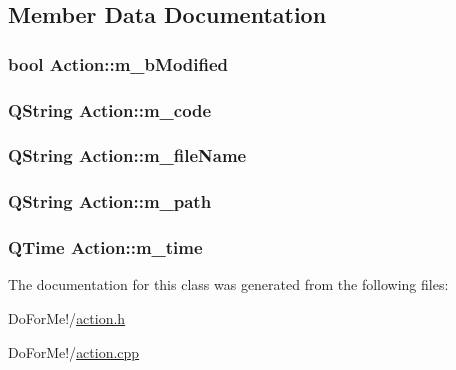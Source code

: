 \subsection{Member Data Documentation}
\hypertarget{class_action_ad7930bec6d8cff987c1882d76642369d}{
\subsubsection[{m\-\_\-b\-Modified}]{\setlength{\rightskip}{0pt plus 5cm}bool Action\-::m\-\_\-b\-Modified\hspace{0.3cm}{\ttfamily [private]}}}\label{class_action_ad7930bec6d8cff987c1882d76642369d}
\hypertarget{class_action_a15cb4f3d394cecf16438d01c05b87c98}{
\subsubsection[{m\-\_\-code}]{\setlength{\rightskip}{0pt plus 5cm}Q\-String Action\-::m\-\_\-code\hspace{0.3cm}{\ttfamily [private]}}}\label{class_action_a15cb4f3d394cecf16438d01c05b87c98}
\hypertarget{class_action_a65a3f717f84c94c351ccff1e4f450816}{
\subsubsection[{m\-\_\-file\-Name}]{\setlength{\rightskip}{0pt plus 5cm}Q\-String Action\-::m\-\_\-file\-Name\hspace{0.3cm}{\ttfamily [private]}}}\label{class_action_a65a3f717f84c94c351ccff1e4f450816}
\hypertarget{class_action_acdaebb900bcc4fa101b7ad7fcc607e01}{
\subsubsection[{m\-\_\-path}]{\setlength{\rightskip}{0pt plus 5cm}Q\-String Action\-::m\-\_\-path\hspace{0.3cm}{\ttfamily [private]}}}\label{class_action_acdaebb900bcc4fa101b7ad7fcc607e01}
\hypertarget{class_action_a00911e1be6fd7fa990a2a607590edaa9}{
\subsubsection[{m\-\_\-time}]{\setlength{\rightskip}{0pt plus 5cm}Q\-Time Action\-::m\-\_\-time\hspace{0.3cm}{\ttfamily [private]}}}\label{class_action_a00911e1be6fd7fa990a2a607590edaa9}


The documentation for this class was generated from the following files\-:\begin{DoxyCompactItemize}
\item 
Do\-For\-Me!/\hyperlink{action_8h}{action.\-h}\item 
Do\-For\-Me!/\hyperlink{action_8cpp}{action.\-cpp}\end{DoxyCompactItemize}
